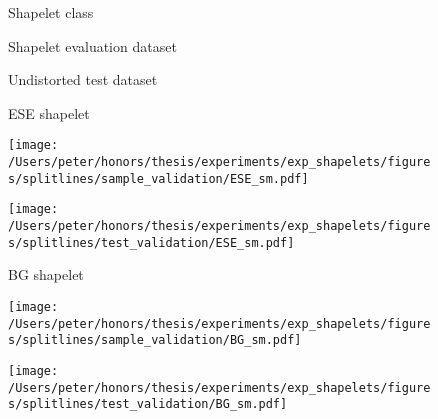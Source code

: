 \begin{figure}[ht!]
	\label{fig:splitlines1}
	\begin{minipage}[c]{\textwidth}
		\label{fig:samplesplitlines}
		\begin{minipage}[c]{\textwidth}
			\begin{minipage}[c]{0.15\textwidth}
				\centering
				Shapelet class
			\end{minipage}
			\begin{minipage}[c]{0.40\textwidth}
				\centering
				Shapelet evaluation dataset
			\end{minipage}
			\begin{minipage}[c]{0.40\textwidth}
				\centering
				Undistorted test dataset
			\end{minipage}
		\end{minipage}
		
		\begin{minipage}[c]{\textwidth}
			\begin{minipage}[c]{0.15\textwidth}
				\centering
				ESE shapelet
			\end{minipage}
			\begin{minipage}[c]{0.40\textwidth}
				\centering
				\texttt{[image: /Users/peter/honors/thesis/experiments/exp\_shapelets/figures/splitlines/sample\_validation/ESE\_sm.pdf]}
			\end{minipage}
			\begin{minipage}[c]{0.40\textwidth}
				\centering
				\texttt{[image: /Users/peter/honors/thesis/experiments/exp\_shapelets/figures/splitlines/test\_validation/ESE\_sm.pdf]}
			\end{minipage}
		\end{minipage}
		
		\begin{minipage}[c]{\textwidth}
			\begin{minipage}[c]{0.15\textwidth}
				\centering
				BG shapelet
			\end{minipage}
			\begin{minipage}[c]{0.40\textwidth}
				\centering
				\texttt{[image: /Users/peter/honors/thesis/experiments/exp\_shapelets/figures/splitlines/sample\_validation/BG\_sm.pdf]}
			\end{minipage}
			\begin{minipage}[c]{0.40\textwidth}	
				\centering
				\texttt{[image: /Users/peter/honors/thesis/experiments/exp\_shapelets/figures/splitlines/test\_validation/BG\_sm.pdf]}
			\end{minipage}
		\end{minipage} \\
	

\end{minipage}
\end{figure}
